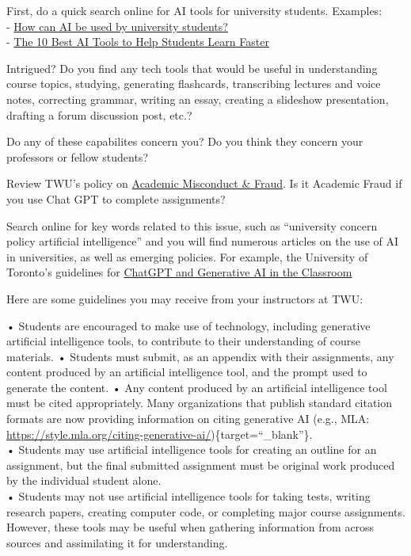 \documentclass[
]{book}
\theoremstyle{definition}
\theoremstyle{definition}
\theoremstyle{definition}
\theoremstyle{definition}
\theoremstyle{remark}
\begin{document}
\begin{reflect}
First, do a quick search online for AI tools for university students.
Examples:\\
- \href{https://www.timeshighereducation.com/student/advice/how-can-ai-be-used-university-students}{How can AI be used by university students?}\\
- \href{https://mystudylife.com/10-best-ai-tools-to-help-students-learn-faster/}{The 10 Best AI Tools to Help Students Learn Faster}

Intrigued? Do you find any tech tools that would be useful in understanding course topics, studying, generating flashcards, transcribing lectures and voice notes, correcting grammar, writing an essay, creating a slideshow presentation, drafting a forum discussion post, etc.?

Do any of these capabilites concern you? Do you think they concern your professors or fellow students?

Review TWU's policy on \href{https://www.twu.ca/about-us/policies-guidelines/university-policies/academic-misconduct-fraud}{Academic Misconduct \& Fraud}. Is it Academic Fraud if you use Chat GPT to complete assignments?

Search online for key words related to this issue, such as ``university concern policy artificial intelligence'' and you will find numerous articles on the use of AI in universities, as well as emerging policies. For example, the University of Toronto's guidelines for \href{https://www.viceprovostundergrad.utoronto.ca/strategic-priorities/digital-learning/special-initiative-artificial-intelligence/}{ChatGPT and Generative AI in the Classroom}

Here are some guidelines you may receive from your instructors at TWU:

• Students are encouraged to make use of technology, including generative artificial intelligence tools, to contribute to their understanding of course materials.
• Students must submit, as an appendix with their assignments, any content produced by an artificial intelligence tool, and the prompt used to generate the content.
• Any content produced by an artificial intelligence tool must be cited appropriately. Many organizations that publish standard citation formats are now providing information on citing generative AI (e.g., MLA: \url{https://style.mla.org/citing-generative-ai/})\{target=``\_blank''\}.\\
• Students may use artificial intelligence tools for creating an outline for an assignment, but the final submitted assignment must be original work produced by the individual student alone.\\
• Students may not use artificial intelligence tools for taking tests, writing research papers, creating computer code, or completing major course assignments. However, these tools may be useful when gathering information from across sources and assimilating it for understanding.


\end{reflect}
\end{document}
